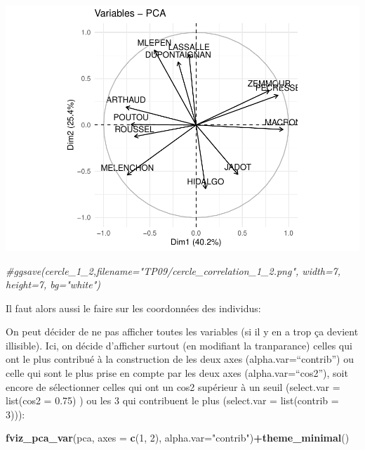 \documentclass[
]{book}
\newenvironment{Shaded}{\begin{snugshade}}{\end{snugshade}}
\newcommand{\AttributeTok}[1]{\textcolor[rgb]{0.13,0.29,0.53}{#1}}
\newcommand{\CommentTok}[1]{\textcolor[rgb]{0.56,0.35,0.01}{\textit{#1}}}
\newcommand{\DecValTok}[1]{\textcolor[rgb]{0.00,0.00,0.81}{#1}}
\newcommand{\FunctionTok}[1]{\textcolor[rgb]{0.13,0.29,0.53}{\textbf{#1}}}
\newcommand{\NormalTok}[1]{#1}
\newcommand{\OtherTok}[1]{\textcolor[rgb]{0.56,0.35,0.01}{#1}}
\newcommand{\SpecialCharTok}[1]{\textcolor[rgb]{0.81,0.36,0.00}{\textbf{#1}}}
\newcommand{\StringTok}[1]{\textcolor[rgb]{0.31,0.60,0.02}{#1}}
\begin{document}
\includegraphics{manuel_geo_quanti_files/figure-latex/unnamed-chunk-64-1.pdf}

\begin{Shaded}
\begin{Highlighting}[]
\CommentTok{\#ggsave(cercle\_1\_2,filename="TP09/cercle\_correlation\_1\_2.png", width=7, height=7, bg="white")}
\end{Highlighting}
\end{Shaded}

Il faut alors aussi le faire sur les coordonnées des individus:

\begin{Shaded}
\end{Shaded}

On peut décider de ne pas afficher toutes les variables (si il y en a trop ça devient illisible). Ici, on décide d'afficher surtout (en modifiant la tranparance) celles qui ont le plus contribué à la construction de les deux axes (alpha.var=``contrib'') ou celle qui sont le plus prise en compte par les deux axes (alpha.var=``cos2''), soit encore de sélectionner celles qui ont un cos2 supérieur à un seuil (select.var = list(cos2 = 0.75) ) ou les 3 qui contribuent le plus (select.var = list(contrib = 3))):

\begin{Shaded}
\begin{Highlighting}[]
\FunctionTok{fviz\_pca\_var}\NormalTok{(pca,  }\AttributeTok{axes =} \FunctionTok{c}\NormalTok{(}\DecValTok{1}\NormalTok{, }\DecValTok{2}\NormalTok{), }\AttributeTok{alpha.var=}\StringTok{"contrib"}\NormalTok{)}\SpecialCharTok{+}\FunctionTok{theme\_minimal}\NormalTok{()}
\end{Highlighting}
\end{Shaded}
\end{document}
